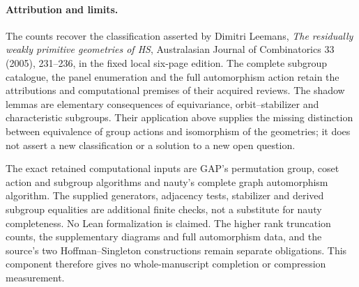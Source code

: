 \documentclass[11pt]{article}
\begin{document}
\paragraph{Attribution and limits.}
The counts recover the classification asserted by Dimitri Leemans,
\emph{The residually weakly primitive geometries of HS},
Australasian Journal of Combinatorics 33 (2005), 231--236,
in the fixed local six-page edition. The complete subgroup catalogue,
the panel enumeration and the full automorphism action retain the
attributions and computational premises of their acquired reviews.
The shadow lemmas are elementary consequences of equivariance,
orbit--stabilizer and characteristic subgroups. Their application
above supplies the missing distinction between equivalence of group
actions and isomorphism of the geometries; it does not assert a new
classification or a solution to a new open question.

The exact retained computational inputs are GAP's permutation group,
coset action and subgroup algorithms and nauty's complete graph
automorphism algorithm. The supplied generators, adjacency tests,
stabilizer and derived subgroup equalities are additional finite
checks, not a substitute for nauty completeness. No Lean
formalization is claimed. The higher rank truncation counts, the
supplementary diagrams and full automorphism data, and the source's
two Hoffman--Singleton constructions remain separate obligations.
This component therefore gives no whole-manuscript completion or
compression measurement.
\end{document}
